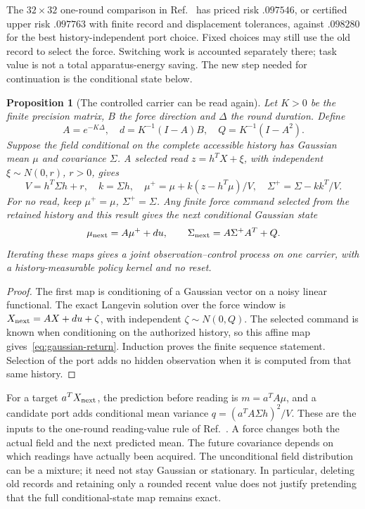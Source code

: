 \documentclass[11pt,a4paper]{article}
\newtheorem{proposition}{Proposition}[section]
\begin{document}
The $32\times32$ one-round comparison in Ref.~\cite{ImprintRG} has priced risk $.097546$, or certified upper risk $.097763$ with finite record and displacement tolerances, against $.098280$ for the best history-independent port choice. Fixed choices may still use the old record to select the force. Switching work is accounted separately there; task value is not a total apparatus-energy saving. The new step needed for continuation is the conditional state below.

\begin{proposition}[The controlled carrier can be read again]
\label{prop:gaussian-return}
Let $K>0$ be the finite precision matrix, $B$ the force direction
and $\Delta$ the round duration. Define
\[
 A=e^{-K\Delta},\quad d=K^{-1}(I-A)B,\quad
 Q=K^{-1}(I-A^2).
\]
Suppose the field conditional on the complete accessible history has
Gaussian mean $\mu$ and covariance $\Sigma$. A selected read
$z=h^TX+\xi$, with independent $\xi\sim N(0,r)$, $r>0$, gives
\[
 V=h^T\Sigma h+r,\quad k=\Sigma h,\quad
 \mu^+=\mu+k(z-h^T\mu)/V,\quad
 \Sigma^+=\Sigma-kk^T/V.
\]
For no read, keep $\mu^+=\mu$, $\Sigma^+=\Sigma$.
Any finite force command selected from the retained history and this
result gives the next conditional Gaussian state
\begin{equation}\label{eq:gaussian-return}
 \mu_{\rm next}=A\mu^++du,\qquad
 \Sigma_{\rm next}=A\Sigma^+A^T+Q.
\end{equation}
Iterating these maps gives a joint observation--control process on
one carrier, with a history-measurable policy kernel and no reset.
\end{proposition}
\begin{proof}
The first map is conditioning of a Gaussian vector on a noisy linear
functional. The exact Langevin solution over the force window is
$X_{\rm next}=AX+du+\zeta$, with independent $\zeta\sim N(0,Q)$.
The selected command is known when conditioning on the authorized
history, so this affine map gives~\eqref{eq:gaussian-return}.
Induction proves the finite sequence statement. Selection of the
port adds no hidden observation when it is computed from that same
history.
\end{proof}

For a target $a^TX_{\rm next}$, the prediction before reading is
$m=a^TA\mu$, and a candidate port adds conditional mean variance
$q=(a^TA\Sigma h)^2/V$. These are the inputs to the one-round
reading-value rule of Ref.~\cite{ImprintRG}. A force changes both
the actual field and the next predicted mean. The future covariance
depends on which readings have actually been acquired. The
unconditional field distribution can be a mixture; it need not stay
Gaussian or stationary. In particular, deleting old records and
retaining only a rounded recent value does not justify pretending
that the full conditional-state map remains exact.
\end{document}
